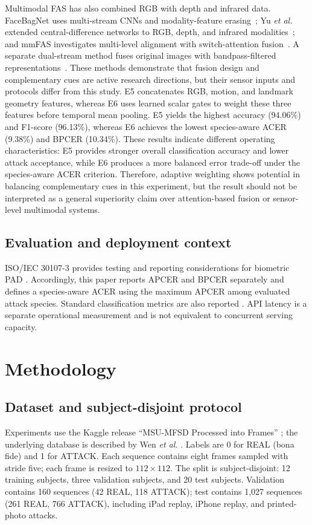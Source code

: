 \documentclass[a4paper,conference]{IEEEtran}
\begin{document}
Multimodal FAS has also combined RGB with depth and infrared data. FaceBagNet uses multi-stream CNNs and modality-feature erasing~\cite{shen2019facebagnet}; Yu \emph{et al.} extended central-difference networks to RGB, depth, and infrared modalities~\cite{yu2020multimodal}; and mmFAS investigates multi-level alignment with switch-attention fusion~\cite{chen2025mmfas}. A separate dual-stream method fuses original images with bandpass-filtered representations~\cite{zeng2023bandpass}. These methods demonstrate that fusion design and complementary cues are active research directions, but their sensor inputs and protocols differ from this study. E5 concatenates RGB, motion, and landmark geometry features, whereas E6 uses learned scalar gates to weight these three features before temporal mean pooling. E5 yields the highest accuracy (94.06\%) and F1-score (96.13\%), whereas E6 achieves the lowest species-aware ACER (9.38\%) and BPCER (10.34\%). These results indicate different operating characteristics: E5 provides stronger overall classification accuracy and lower attack acceptance,
while E6 produces a more balanced error trade-off under the species-aware ACER criterion. Therefore, adaptive weighting shows potential in balancing complementary cues in this experiment, but the result should not be interpreted as a general superiority claim over attention-based fusion or
sensor-level multimodal systems.

\subsection{Evaluation and deployment context}
ISO/IEC 30107-3 provides testing and reporting considerations for biometric PAD \cite{iso30107}. Accordingly, this paper reports APCER and BPCER separately and defines a species-aware ACER using the maximum APCER among evaluated attack species. Standard classification metrics are also reported \cite{sokolova2009}. API latency is a separate operational measurement and is not equivalent to concurrent serving capacity.

\section{Methodology}
\subsection{Dataset and subject-disjoint protocol}
Experiments use the Kaggle release ``MSU-MFSD Processed into Frames'' \cite{kagglemsumfsd}; the underlying database is described by Wen \emph{et al.} \cite{wen2015ida}. Labels are 0 for REAL (bona fide) and 1 for ATTACK. Each sequence contains eight frames sampled with stride five; each frame is resized to $112\times112$. The split is subject-disjoint: 12 training subjects, three validation subjects, and 20 test subjects. Validation contains 160 sequences (42 REAL, 118 ATTACK); test contains 1,027 sequences (261 REAL, 766 ATTACK), including iPad replay, iPhone replay, and printed-photo attacks.
\end{document}
